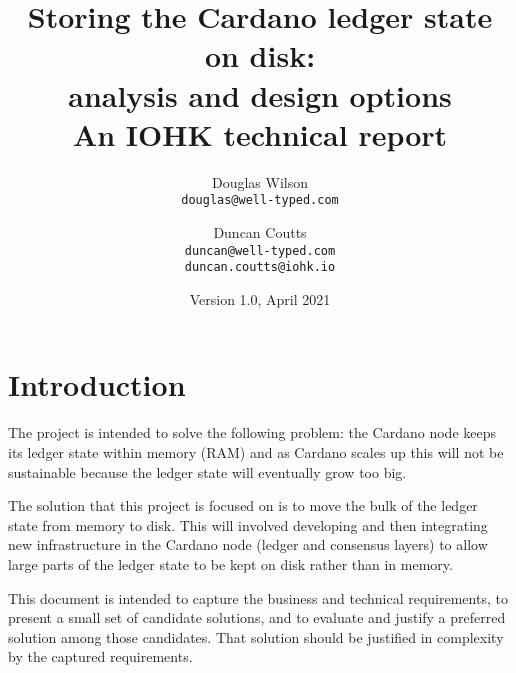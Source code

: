 \documentclass[11pt,a4paper]{article}
\begin{document}
\title{Storing the Cardano ledger state on disk: \\
       analysis and design options \\
       {\large \sc An IOHK technical report}
  }
\date{Version 1.0, April 2021}
\author{Douglas Wilson     \\ {\small \texttt{douglas@well-typed.com}} \\
   \and Duncan Coutts      \\ {\small \texttt{duncan@well-typed.com}} \\
                              {\small \texttt{duncan.coutts@iohk.io}}
   }

\maketitle

\begin{changelog}[simple, sectioncmd=\section*]
\end{changelog}

\section{Introduction}
\label{introduction}

The project is intended to solve the following problem: the Cardano node keeps
its ledger state within memory (RAM) and as Cardano scales up this will not be
sustainable because the ledger state will eventually grow too big.

The solution that this project is focused on is to move the bulk of the ledger
state from memory to disk. This will involved developing and then integrating
new infrastructure in the Cardano node (ledger and consensus layers) to allow
large parts of the ledger state to be kept on disk rather than in memory.

This document is intended to capture the business and technical requirements,
to present a small set of candidate solutions, and to evaluate and justify a
preferred solution among those candidates. That solution should be justified in
complexity by the captured requirements.

\tableofcontents

\end{document}
